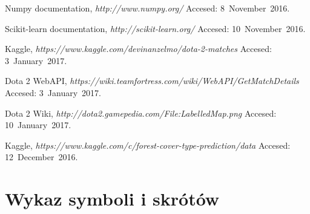 \documentclass[pl]{minipw} %
\begin{document}
\begin{thebibliography}{20}
  Numpy documentation,
  \emph{http://www.numpy.org/}
  Accesed: 8~November~2016.  
  
  Scikit-learn documentation,
  \emph{http://scikit-learn.org/}  
  Accesed: 10~November~2016.
  
  Kaggle,
  \emph{https://www.kaggle.com/devinanzelmo/dota-2-matches}
  Accesed: 3~January~2017.
  
  Dota 2 WebAPI,
  \emph{https://wiki.teamfortress.com/wiki/WebAPI/GetMatchDetails}
  Accesed: 3~January~2017.
  
  Dota 2 Wiki,
  \emph{http://dota2.gamepedia.com/File:Labelled\textunderscore Map.png}
  Accesed: 10~January~2017.

  Kaggle,
  \emph{https://www.kaggle.com/c/forest-cover-type-prediction/data}
  Accesed: 12~December~2016.

\end{thebibliography}



\chapter*{Wykaz symboli i skrótów}
\end{document}

